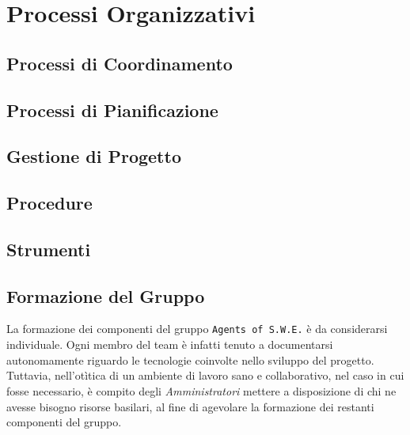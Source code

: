 \section{Processi Organizzativi}\label{ProcessiOrganizzativi}

\subsection{Processi di Coordinamento}\label{ProcessiOrganizzativi_ProcessiCoordinamento}


\subsection{Processi di Pianificazione}



\subsection{Gestione di Progetto}\label{ProcessiOrganizzativi_GestioneProgetto}


\subsection{Procedure}\label{ProcessiOrganizzativi_Procedure}


\subsection{Strumenti}\label{ProcessiOrganizzativi_Strumenti}


\subsection{Formazione del Gruppo}\label{ProcessiOrganizzativi_FormazioneGruppo}
	La formazione dei componenti del gruppo \texttt{Agents of S.W.E.} è da considerarsi individuale. Ogni membro del team è infatti tenuto a documentarsi autonomamente riguardo le tecnologie coinvolte nello sviluppo del 								progetto\glossario. Tuttavia, nell'otìtica di un ambiente di lavoro sano e collaborativo, nel caso in cui fosse necessario, è compito degli \textit{Amministratori} mettere a disposizione di chi ne avesse bisogno risorse basilari, al fine di	agevolare la formazione dei restanti componenti del gruppo.
